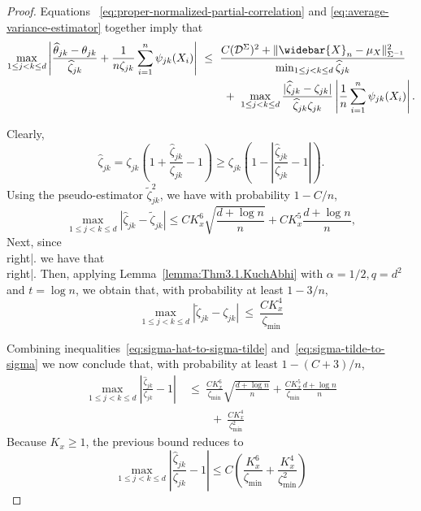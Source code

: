 \documentclass{article}
\begin{document}
\begin{appendices}
\begin{proof}
 
 Equations ~\eqref{eq:proper-normalized-partial-correlation} and \eqref{eq:average-variance-estimator} together imply that
 \begin{equation}\label{eq:combination-influence-fn-exp-partial-correlation}
 \begin{split}
 \max_{1\le j < k\le d}\left|\frac{\widehat{\theta}_{jk} - \theta_{jk}}{\widehat{\zeta}_{jk}} + \frac{1}{n\zeta_{jk}}\sum_{i=1}^n \psi_{jk}(X_i)\right| ~&\le~ \frac{C(\mathcal{D}^{\Sigma})^2 + \|\widebar{X}_n - \mu_X\|_{\Sigma^{-1}}^2}{\min_{1\le j < k\le d}\widehat{\zeta}_{jk}}\\
 ~&\qquad+~ \max_{1\le j < k\le d}\frac{|\widehat{\zeta}_{jk} - \zeta_{jk}|}{\widehat{\zeta}_{jk}\zeta_{jk}}\left|\frac{1}{n}\sum_{i=1}^n \psi_{jk}(X_i)\right|. 
 \end{split}
 \end{equation}
 
 
 
 
 Clearly,
 \begin{equation}\label{eq:bound-hat.sigma-sigma}
 \widehat{\zeta}_{jk} = \zeta_{jk}\left(1 + \frac{\widehat{\zeta}_{jk}}{\zeta_{jk}} - 1\right) \ge \zeta_{jk}\left(1 - \left|\frac{\widehat{\zeta}_{jk}}{\zeta_{jk}} - 1\right|\right).
 \end{equation}
 Using the pseudo-estimator $\widetilde{\zeta}_{jk}^2$, we have with probability $1 - C/n$,
 \begin{equation}\label{eq:sigma-hat-to-sigma-tilde}
 \max_{1\le j < k\le d}|\widehat{\zeta}_{jk} - \widetilde{\zeta}_{jk}| \le CK_x^6\sqrt{\frac{d + \log n}{n}} + CK_x^5\frac{d + \log n}{n},
 \end{equation}
 Next, since
 \\right|.
 \]
 we have that
 \\right|.
 \]
 Then, applying  Lemma~\ref{lemma:Thm3.1.KuchAbhi} with $\alpha = 1/2, q = d^2$ and $t = \log n$,  we obtain that, with probability at least $1 - 3/n$,
 \begin{equation}\label{eq:sigma-tilde-to-sigma}
 \max_{1\le j < k\le d}\left|\widetilde{\zeta}_{jk} - \zeta_{jk}\right| ~\le~ \frac{CK_x^4}{\zeta_{\min}}\left.
 \end{equation}
 
 
 Combining inequalities~\eqref{eq:sigma-hat-to-sigma-tilde} and~\eqref{eq:sigma-tilde-to-sigma} we now conclude that, with probability at least $1 - (C+3)/n$,
 \begin{align*}
 \max_{1\le j < k\le d}\left|\frac{\widehat{\zeta}_{jk}}{\zeta_{jk}} - 1\right| ~&\le~ \frac{CK_x^6}{\zeta_{\min}}\sqrt{\frac{d + \log n}{n}} + \frac{CK_x^5}{\zeta_{\min}}\frac{d + \log n}{n}\\
 ~&\qquad+~ \frac{CK_x^4}{\zeta_{\min}^2}\left.
 \end{align*}
 Because $K_x \ge 1$, the previous bound reduces to
 \begin{equation}\label{eq:sigma-hat-to-sigma}
 \max_{1\le j < k\le d}\left|\frac{\widehat{\zeta}_{jk}}{\zeta_{jk}} - 1\right|  \leq C\left(\frac{K_x^6}{\zeta_{\min}} + \frac{K_x^4}{\zeta_{\min}^2}\right)\left. 
 

\end{equation}
\end{proof}
\end{appendices}
\end{document}
